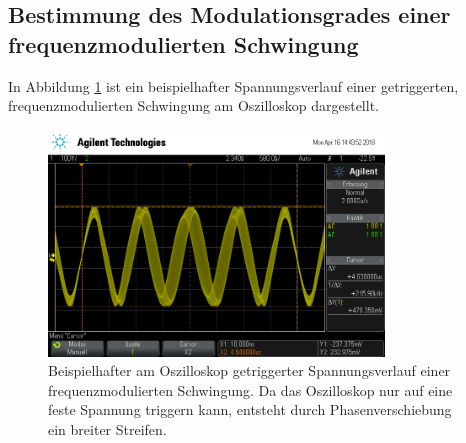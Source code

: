 \subsection{Bestimmung des Modulationsgrades einer frequenzmodulierten Schwingung}
\label{sec:bestmod}

In Abbildung \ref{fig:bestmod} ist ein beispielhafter Spannungsverlauf einer getriggerten, frequenzmodulierten Schwingung
am Oszilloskop dargestellt.

\begin{figure}
  \centering
  \includegraphics[height=6cm]{Oszi_Pics/freqModRing.png}
  \caption{Beispielhafter am Oszilloskop getriggerter Spannungsverlauf einer frequenzmodulierten Schwingung. Da das Oszilloskop
  nur auf eine feste Spannung triggern kann, entsteht durch Phasenverschiebung ein breiter Streifen.}
  \label{fig:bestmod}
\end{figure}

